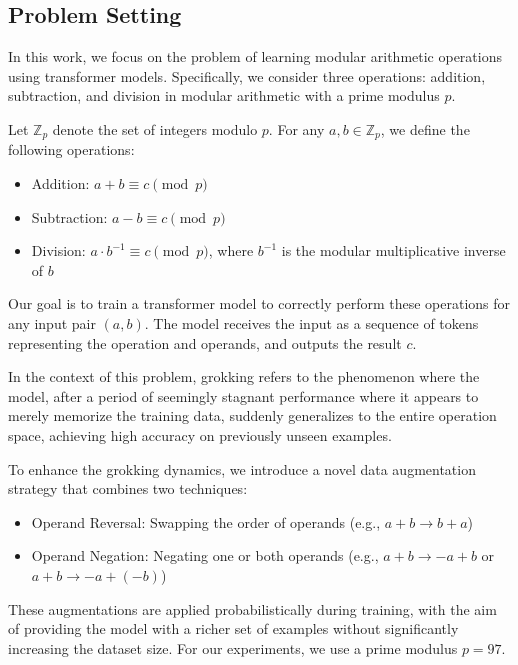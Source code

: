 \documentclass{article} %
\begin{document}
\subsection{Problem Setting}

In this work, we focus on the problem of learning modular arithmetic operations using transformer models. Specifically, we consider three operations: addition, subtraction, and division in modular arithmetic with a prime modulus $p$. 

Let $\mathbb{Z}_p$ denote the set of integers modulo $p$. For any $a, b \in \mathbb{Z}_p$, we define the following operations:

\begin{itemize}
    \item Addition: $a + b \equiv c \pmod{p}$
    \item Subtraction: $a - b \equiv c \pmod{p}$
    \item Division: $a \cdot b^{-1} \equiv c \pmod{p}$, where $b^{-1}$ is the modular multiplicative inverse of $b$
\end{itemize}

Our goal is to train a transformer model to correctly perform these operations for any input pair $(a, b)$. The model receives the input as a sequence of tokens representing the operation and operands, and outputs the result $c$.

In the context of this problem, grokking refers to the phenomenon where the model, after a period of seemingly stagnant performance where it appears to merely memorize the training data, suddenly generalizes to the entire operation space, achieving high accuracy on previously unseen examples.

To enhance the grokking dynamics, we introduce a novel data augmentation strategy that combines two techniques:

\begin{itemize}
    \item Operand Reversal: Swapping the order of operands (e.g., $a + b \rightarrow b + a$)
    \item Operand Negation: Negating one or both operands (e.g., $a + b \rightarrow -a + b$ or $a + b \rightarrow -a + (-b)$)
\end{itemize}

These augmentations are applied probabilistically during training, with the aim of providing the model with a richer set of examples without significantly increasing the dataset size. For our experiments, we use a prime modulus $p = 97$.
\end{document}
